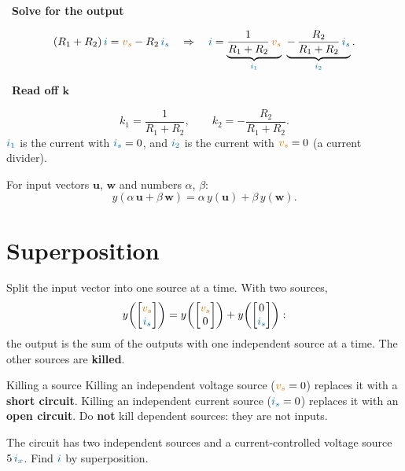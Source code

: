 \documentclass[11pt,a4paper]{article}
\newcommand{\Icol}[1]{\textcolor{ccur}{#1}}
\newcommand{\Vcol}[1]{\textcolor{cvolt}{#1}}
\newcommand{\uni}[1]{\,\mathrm{#1}}
\newcommand{\A}{\uni{A}}   \newcommand{\V}{\uni{V}}
\newif\ifsolfirst
\newcommand{\solstep}[2]{\par\ifsolfirst\global\solfirstfalse\else\medskip\needspace{5\baselineskip}\fi
  \noindent{\color{cpow}\bfseries Step #1.}\ {\bfseries #2}\par\nobreak\smallskip}
\newcommand{\ohm}{\,\Omega}
\newcommand{\exS}[1]{%
  \ifnum#1=2
    \draw (0,2.2) -- (0,0);
    \node[font=\small, text=metured, rotate=90] at (-0.3,1.1) {short};
  \else
    \draw (0,2.2) to[american voltage source, l_=$\Vcol{20\V}$] (0,0);
  \fi
  \draw (0,2.2) to[R, l=$15\ohm$] (3.4,2.2) to[R, l=$10\ohm$] (6.8,2.2);
  \ifnum#1=1
    \draw (3.4,2.2) -- (3.4,1.75); \draw (3.4,0) -- (3.4,0.45);
    \draw (3.4,1.75) node[ocirc] {}; \draw (3.4,0.45) node[ocirc] {};
    \node[font=\small, text=metured] at (2.85,1.1) {open};
  \else
    \draw (3.4,0) to[american current source, l=$\Icol{4\A}$] (3.4,2.2);
  \fi
  \draw (6.8,0) to[american controlled voltage source, l_=$\Vcol{5\,i_x}$] (6.8,2.2);
  \draw (0,0) -- (6.8,0);
  \fill (3.4,2.2) circle (1.7pt); \fill (3.4,0) circle (1.7pt);
  \draw[iar] (0.6,1.8) -- (1.4,1.8); \node[font=\small, text=ccur] at (1.0,1.48) {$i_x$};
  \draw[iar] (4.6,1.8) -- (5.4,1.8);
  \node[font=\small, text=ccur] at (5.0,1.48) {\ifcase#1 $i$\or $i_1$\or $i_2$\fi};}
\begin{document}
\solstep{2}{Solve for the output}
\[
  (R_1 + R_2)\,\Icol{i} = \Vcol{v_s} - R_2\,\Icol{i_s}
  \quad\Rightarrow\quad
  \Icol{i} = \underbrace{\frac{1}{R_1 + R_2}\,\Vcol{v_s}}_{\Icol{i_1}}
  \ \underbrace{-\,\frac{R_2}{R_1 + R_2}\,\Icol{i_s}}_{\Icol{i_2}} .
\]

\solstep{3}{Read off $\boldsymbol{\mathbf{k}}$}
\[
  k_1 = \frac{1}{R_1 + R_2}, \qquad k_2 = -\frac{R_2}{R_1 + R_2} .
\]
$\Icol{i_1}$ is the current with $\Icol{i_s} = 0$, and $\Icol{i_2}$ is the current with
$\Vcol{v_s} = 0$ (a current divider).


\begin{ideabox}
For input vectors $\mathbf{u}$, $\mathbf{w}$ and numbers $\alpha$, $\beta$:
\[
  y(\alpha\,\mathbf{u} + \beta\,\mathbf{w}) = \alpha\,y(\mathbf{u}) + \beta\,y(\mathbf{w}) .
\]
\end{ideabox}

\section{Superposition}

Split the input vector into one source at a time. With two sources,
\[
  y\!\left(\begin{bmatrix} \Vcol{v_s}\\ \Icol{i_s} \end{bmatrix}\right)
  = y\!\left(\begin{bmatrix} \Vcol{v_s}\\ 0 \end{bmatrix}\right)
  + y\!\left(\begin{bmatrix} 0\\ \Icol{i_s} \end{bmatrix}\right) :
\]
the output is the sum of the outputs with one independent source at a time. The other
sources are \textbf{killed}.

\begin{definitionbox}{Killing a source}
Killing an independent voltage source ($\Vcol{v_s} = 0$) replaces it with a \textbf{short
circuit}. Killing an independent current source ($\Icol{i_s} = 0$) replaces it with an
\textbf{open circuit}. Do \textbf{not} kill dependent sources: they are not inputs.
\end{definitionbox}

\bigskip
\begin{examplebox}
\begin{minipage}[c]{0.56\linewidth}
\centering
{}
\end{minipage}\hfill
\begin{minipage}[c]{0.4\linewidth}
The circuit has two independent sources and a current-controlled voltage source
$5\,\Icol{i_x}$. Find $\Icol{i}$ by superposition.
\end{minipage}
\end{examplebox}
\end{document}

